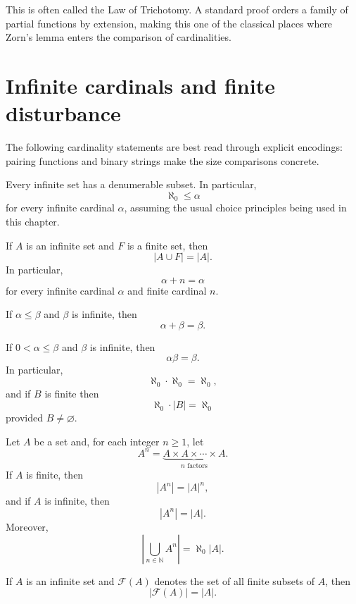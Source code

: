 \begin{remark}
This is often called the Law of Trichotomy.  A standard proof orders a family of partial functions by extension, making this one of the classical places where Zorn's lemma enters the comparison of cardinalities.
\end{remark}

\section{Infinite cardinals and finite disturbance}

The following cardinality statements are best read through explicit encodings: pairing functions and binary strings make the size comparisons concrete.

\begin{theorem}
Every infinite set has a denumerable subset.  In particular,
\[
  \aleph_0\le \alpha
\]
for every infinite cardinal \(\alpha\), assuming the usual choice principles being used in this chapter.
\end{theorem}

\begin{lemma}
If \(A\) is an infinite set and \(F\) is a finite set, then
\[
  |A\cup F|=|A|.
\]
In particular,
\[
  \alpha+n=\alpha
\]
for every infinite cardinal \(\alpha\) and finite cardinal \(n\).
\end{lemma}

\begin{theorem}
If \(\alpha\le\beta\) and \(\beta\) is infinite, then
\[
  \alpha+\beta=\beta.
\]
\end{theorem}

\begin{theorem}
If \(0<\alpha\le\beta\) and \(\beta\) is infinite, then
\[
  \alpha\beta=\beta.
\]
In particular,
\[
  \aleph_0\cdot\aleph_0=\aleph_0,
\]
and if \(B\) is finite then
\[
  \aleph_0\cdot |B|=\aleph_0
\]
provided \(B\neq\varnothing\).
\end{theorem}

\begin{theorem}
Let \(A\) be a set and, for each integer \(n\ge1\), let
\[
  A^n=\underbrace{A\times A\times\cdots\times A}_{n\text{ factors}}.
\]
If \(A\) is finite, then
\[
  |A^n|=|A|^n,
\]
and if \(A\) is infinite, then
\[
  |A^n|=|A|.
\]
Moreover,
\[
  \left|\bigcup_{n\in\mathbb N}A^n\right|=\aleph_0|A|.
\]
\end{theorem}

\begin{corollary}
If \(A\) is an infinite set and \(\mathcal F(A)\) denotes the set of all finite subsets of \(A\), then
\[
  |\mathcal F(A)|=|A|.
\]
\end{corollary}


